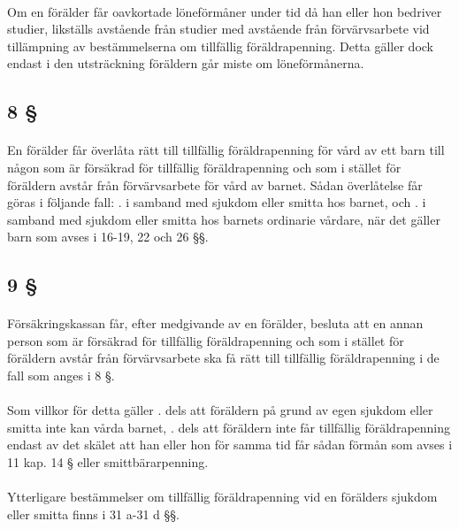 \documentclass[a4paper,notitlepage,openany,10pt]{book}
\begin{document}
\paragraph*{}
Om en förälder får oavkortade löneförmåner under tid då han eller hon bedriver studier, likställs avstående från studier med avstående från förvärvsarbete vid tillämpning av bestämmelserna om tillfällig föräldrapenning. Detta gäller dock endast i den utsträckning föräldern går miste om löneförmånerna.
\subsection*{8 §}
\paragraph*{}
En förälder får överlåta rätt till tillfällig föräldrapenning för vård av ett barn till någon som är försäkrad för tillfällig föräldrapenning och som i stället för föräldern avstår från förvärvsarbete för vård av barnet.
Sådan överlåtelse får göras i följande fall:
. i samband med sjukdom eller smitta hos barnet, och
. i samband med sjukdom eller smitta hos barnets ordinarie vårdare, när det gäller barn som avses i 16-19, 22 och 26 §§.
\subsection*{9 §}
\paragraph*{}
Försäkringskassan får, efter medgivande av en förälder, besluta att en annan person som är försäkrad för tillfällig föräldrapenning och som i stället för föräldern avstår från förvärvsarbete ska få rätt till tillfällig föräldrapenning i de fall som anges i 8 §.
\paragraph*{}
Som villkor för detta gäller
. dels att föräldern på grund av egen sjukdom eller smitta inte kan vårda barnet,
. dels att föräldern inte får tillfällig föräldrapenning endast av det skälet att han eller hon för samma tid får sådan förmån som avses i 11 kap. 14 § eller smittbärarpenning.
\paragraph*{}
Ytterligare bestämmelser om tillfällig föräldrapenning vid en förälders sjukdom eller smitta finns i 31 a-31 d §§.
\end{document}
